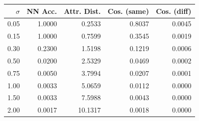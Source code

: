 \begin{tabular}{rrrrr}
\toprule
$\sigma$ & \textbf{NN Acc.} & \textbf{Attr. Dist.} & \textbf{Cos. (same)} & \textbf{Cos. (diff)} \\
\midrule
0.05 & 1.0000 & 0.2533 & 0.8037 & 0.0045 \\
0.15 & 1.0000 & 0.7599 & 0.3545 & 0.0019 \\
0.30 & 0.2300 & 1.5198 & 0.1219 & 0.0006 \\
0.50 & 0.0200 & 2.5329 & 0.0469 & 0.0002 \\
0.75 & 0.0050 & 3.7994 & 0.0207 & 0.0001 \\
1.00 & 0.0033 & 5.0659 & 0.0112 & 0.0000 \\
1.50 & 0.0033 & 7.5988 & 0.0043 & 0.0000 \\
2.00 & 0.0017 & 10.1317 & 0.0018 & 0.0000 \\
\bottomrule
\end{tabular}
